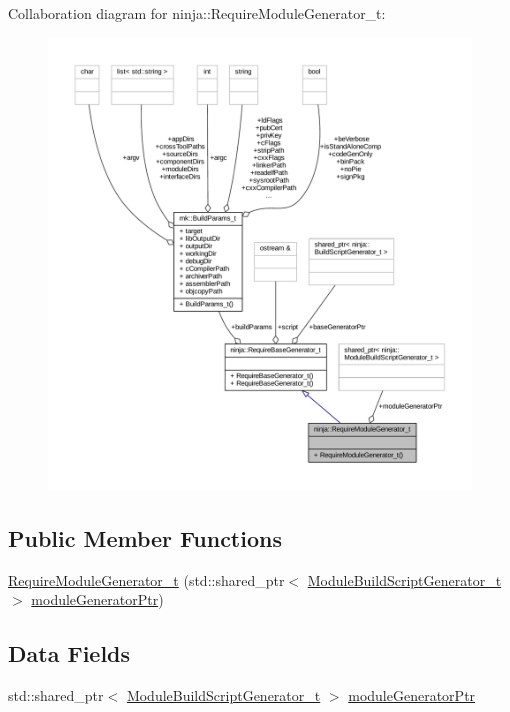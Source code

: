 Collaboration diagram for ninja\+:\+:Require\+Module\+Generator\+\_\+t\+:
\nopagebreak
\begin{figure}[H]
\begin{center}
\leavevmode
\includegraphics[width=350pt]{structninja_1_1_require_module_generator__t__coll__graph}
\end{center}
\end{figure}
\subsection*{Public Member Functions}
\begin{DoxyCompactItemize}
\item 
\hyperlink{structninja_1_1_require_module_generator__t_ae5acb9b31bbeced04c29b855d2d9e3ef}{Require\+Module\+Generator\+\_\+t} (std\+::shared\+\_\+ptr$<$ \hyperlink{classninja_1_1_module_build_script_generator__t}{Module\+Build\+Script\+Generator\+\_\+t} $>$ \hyperlink{structninja_1_1_require_module_generator__t_a4c8d24c29079a31a7050e080ac48b55b}{module\+Generator\+Ptr})
\end{DoxyCompactItemize}
\subsection*{Data Fields}
\begin{DoxyCompactItemize}
\item 
std\+::shared\+\_\+ptr$<$ \hyperlink{classninja_1_1_module_build_script_generator__t}{Module\+Build\+Script\+Generator\+\_\+t} $>$ \hyperlink{structninja_1_1_require_module_generator__t_a4c8d24c29079a31a7050e080ac48b55b}{module\+Generator\+Ptr}
\end{DoxyCompactItemize}


